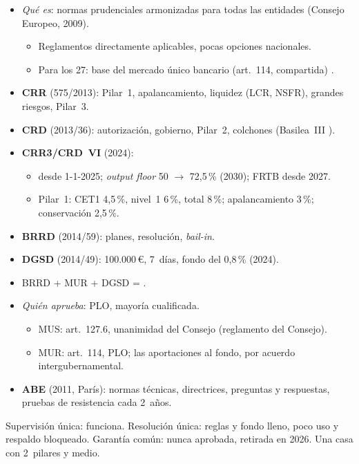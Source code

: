\documentclass{article}
\begin{document}
\begin{columnas}
\begin{itemize}
\item \emph{Qué es}: normas prudenciales armonizadas para todas las entidades (Consejo Europeo, 2009).
  \begin{itemize}
  \item Reglamentos directamente aplicables, pocas opciones nacionales.
  \item Para los 27: base del mercado único bancario (art.~114, compartida) .
  \end{itemize}
\item \textbf{CRR} (575/2013): Pilar~1, apalancamiento, liquidez (LCR, NSFR), grandes riesgos, Pilar~3.
\item \textbf{CRD} (2013/36): autorización, gobierno, Pilar~2, colchones (Basilea~III ).
\item \textbf{CRR3/CRD~VI} (2024):
  \begin{itemize}
  \item desde 1-1-2025; \emph{output floor} 50 $\to$ 72,5\,\% (2030); FRTB desde 2027.
  \item Pilar~1: CET1 4,5\,\%, nivel~1 6\,\%, total 8\,\%; apalancamiento 3\,\%; conservación 2,5\,\%.
  \end{itemize}
\item \textbf{BRRD} (2014/59): planes, resolución, \emph{bail-in}.
\item \textbf{DGSD} (2014/49): 100.000\,€, 7~días, fondo del 0,8\,\% (2024).
\item BRRD + MUR + DGSD = .
\item \emph{Quién aprueba}: PLO, mayoría cualificada.
  \begin{itemize}
  \item MUS: art.~127.6, unanimidad del Consejo (reglamento del Consejo).
  \item MUR: art.~114, PLO; las aportaciones al fondo, por acuerdo intergubernamental.
  \end{itemize}
\item \textbf{ABE} (2011, París): normas técnicas, directrices, preguntas y respuestas, pruebas de resistencia cada 2~años.
\end{itemize}

\begin{ideaclave}
Supervisión única: funciona. Resolución única: reglas y fondo lleno, poco uso y respaldo bloqueado. Garantía común: nunca aprobada, retirada en 2026. Una casa con 2~pilares y medio.
\end{ideaclave}


\end{columnas}
\end{document}
